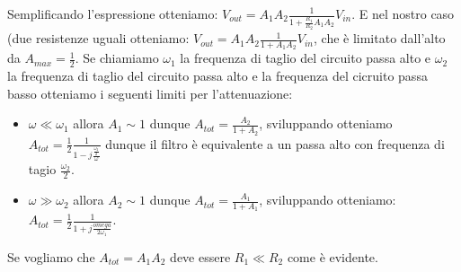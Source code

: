 \documentclass[10pt,a4paper]{article}
\begin{document}
Semplificando l'espressione otteniamo: $V_{out} = A_{1} A_{2} \frac{1}{1+\frac{R_1}{R_2} A_1 A_2} V_{in}$.
E nel nostro caso (due resistenze uguali otteniamo:
$V_{out} = A_{1} A_{2} \frac{1}{1+A_1 A_2} V_{in}$, che è limitato dall'alto da $A_{max} = \frac{1}{2}$.
Se chiamiamo $\omega_1$ la frequenza di taglio del circuito passa alto e $\omega_2$ la frequenza di taglio del circuito passa alto e la frequenza del cicruito passa basso otteniamo i seguenti limiti per l'attenuazione:
\begin{itemize}
\item $\omega \ll \omega_1$ allora $A_1 \sim 1$ dunque 
$A_{tot} = \frac{A_2}{1+A_2}$, sviluppando otteniamo 
$A_{tot} = \frac{1}{2} \frac{1}{1-j \frac{\frac{\omega_2}{2}}{\omega}}$ dunque il filtro è equivalente a un passa alto con frequenza di tagio $\frac{\omega_2}{2}$. 
\item $\omega \gg \omega_2$ allora $A_2 \sim 1$ dunque 
$A_{tot} = \frac{A_1}{1+A_1}$, sviluppando otteniamo:
$A_{tot} = \frac{1}{2} \frac{1}{1+j \frac{omega}{2 \omega_1}}$.
\end{itemize}

Se vogliamo che $A_{tot} = A_1 A_2$ deve essere $R_1 \ll R_2$ come è evidente.
\end{document}
